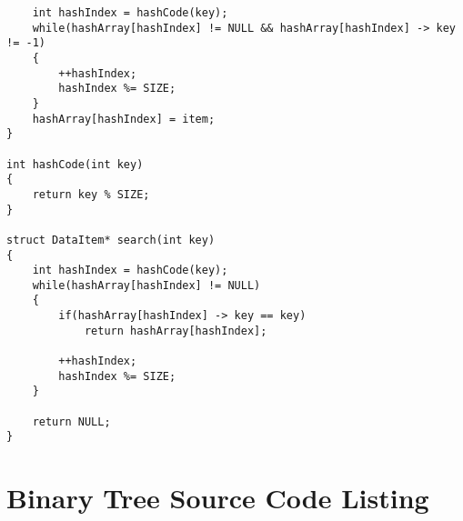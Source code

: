 \documentclass[10pt, a4paper, twosize]{article}
\begin{document}
\begin{lstlisting}
    int hashIndex = hashCode(key);
    while(hashArray[hashIndex] != NULL && hashArray[hashIndex] -> key != -1)
    {
        ++hashIndex;
        hashIndex %= SIZE;
    }
    hashArray[hashIndex] = item;
}

int hashCode(int key)
{
    return key % SIZE;
}

struct DataItem* search(int key)
{
    int hashIndex = hashCode(key);
    while(hashArray[hashIndex] != NULL)
    {
        if(hashArray[hashIndex] -> key == key)
            return hashArray[hashIndex];

        ++hashIndex;
        hashIndex %= SIZE;
    }

    return NULL;
}
\end{lstlisting}

\section{Binary Tree Source Code Listing}
\label{binary_tree_listing}
\end{document}
